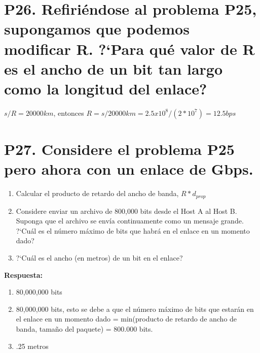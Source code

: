 \documentclass[a4paper, 11pt]{article}
\theoremstyle{definition} \theoremstyle{remark}
\begin{document}
     \section{P26. Refiri\'endose al problema P25, supongamos que podemos modificar R. ?`Para qu\'e valor de R es el ancho de un bit tan largo como la longitud del enlace?}
     $s/R=20000km$, entonces $R=s/20000km=2.5x10^8/(2*10^7) = 12.5bps$

     \section{P27. Considere el problema P25 pero ahora con un enlace de Gbps.}
     \renewcommand{\theenumi}{\alph{enumi}}
     \begin{enumerate}
       \item Calcular el producto de retardo del ancho de banda, $R*d_{prop}$
       \item Considere enviar un archivo de 800,000 bits desde el Host A al Host B. Suponga que el archivo se env\'ia continuamente como un mensaje grande. ?`Cu\'al es el n\'umero m\'aximo de bits que habr\'a en el enlace en un momento dado?
       \item ?`Cu\'al es el ancho (en metros) de un bit en el enlace?
     \end{enumerate}
     \textbf{Respuesta:}
     \renewcommand{\theenumi}{\alph{enumi}}
     \begin{enumerate}
       \item 80,000,000 bits
       \item 80,000,000 bits, esto se debe a que el n\'umero m\'aximo de bits que estar\'an en el enlace en un momento dado = min(producto de retardo de ancho de banda, tama\~{n}o del paquete) = 800.000 bits.
       \item .25 metros
     \end{enumerate}
\end{document}
